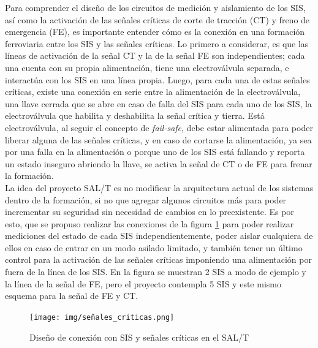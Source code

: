Para comprender el diseño de los circuitos de medición y aislamiento de los SIS, así como la activación de las señales críticas de corte de tracción (CT) y freno de emergencia (FE), es importante entender cómo es la conexión en una formación ferroviaria entre los SIS y las señales críticas. Lo primero a considerar, es que las líneas de activación de la señal CT y la de la señal FE son independientes; cada una cuenta con su propia alimentación, tiene una electroválvula separada, e interactúa con los SIS en una línea propia. Luego, para cada una de estas señales críticas, existe una conexión en serie entre la alimentación de la electroválvula, una llave cerrada que se abre en caso de falla del SIS para cada uno de los SIS, la electroválvula que habilita y deshabilita la señal crítica y tierra. Está electroválvula, al seguir el concepto de \textit{fail-safe}, debe estar alimentada para poder liberar alguna de las señales críticas, y en caso de cortarse la alimentación, ya sea por una falla en la alimentación o porque uno de los SIS está fallando y reporta un estado inseguro abriendo la llave, se activa la señal de CT o de FE para frenar la formación. \\

La idea del proyecto SAL/T es no modificar la arquitectura actual de los sistemas dentro de la formación, si no que agregar algunos circuitos más para poder incrementar su seguridad sin necesidad de cambios en lo preexistente. Es por esto, que se propuso realizar las conexiones de la figura \ref{fig:señales_criticas} para poder realizar mediciones del estado de cada SIS independientemente, poder aislar cualquiera de ellos en caso de entrar en un modo asilado limitado, y también tener un último control para la activación de las señales críticas imponiendo una alimentación por fuera de la línea de los SIS. En la figura se muestran 2 SIS a modo de ejemplo y la línea de la señal de FE, pero el proyecto contempla 5 SIS y este mismo esquema para la señal de FE y CT. 


\begin{figure}[H]
    \centering
    \texttt{[image: img/señales\_criticas.png]}
    \caption{Diseño de conexión con SIS y señales críticas en el SAL/T}
    \label{fig:señales_criticas}
\end{figure}


